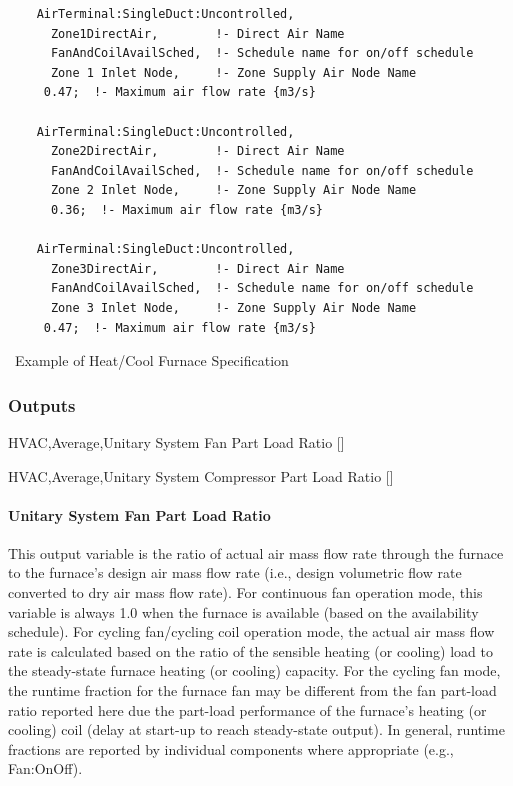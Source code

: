 \begin{lstlisting}
    AirTerminal:SingleDuct:Uncontrolled,
      Zone1DirectAir,        !- Direct Air Name
      FanAndCoilAvailSched,  !- Schedule name for on/off schedule
      Zone 1 Inlet Node,     !- Zone Supply Air Node Name
     0.47;  !- Maximum air flow rate {m3/s}

    AirTerminal:SingleDuct:Uncontrolled,
      Zone2DirectAir,        !- Direct Air Name
      FanAndCoilAvailSched,  !- Schedule name for on/off schedule
      Zone 2 Inlet Node,     !- Zone Supply Air Node Name
      0.36;  !- Maximum air flow rate {m3/s}

    AirTerminal:SingleDuct:Uncontrolled,
      Zone3DirectAir,        !- Direct Air Name
      FanAndCoilAvailSched,  !- Schedule name for on/off schedule
      Zone 3 Inlet Node,     !- Zone Supply Air Node Name
     0.47;  !- Maximum air flow rate {m3/s}
\end{lstlisting}

~Example of Heat/Cool Furnace Specification

\subsubsection{Outputs}\label{outputs-1-029}

HVAC,Average,Unitary System Fan Part Load Ratio {[]}

HVAC,Average,Unitary System Compressor Part Load Ratio {[]}

\paragraph{Unitary System Fan Part Load Ratio}\label{unitary-system-fan-part-load-ratio-1}

This output variable is the ratio of actual air mass flow rate through the furnace to the furnace's design air mass flow rate (i.e., design volumetric flow rate converted to dry air mass flow rate). For continuous fan operation mode, this variable is always 1.0 when the furnace is available (based on the availability schedule). For cycling fan/cycling coil operation mode, the actual air mass flow rate is calculated based on the ratio of the sensible heating (or cooling) load to the steady-state furnace heating (or cooling) capacity. For the cycling fan mode, the runtime fraction for the furnace fan may be different from the fan part-load ratio reported here due the part-load performance of the furnace's heating (or cooling) coil (delay at start-up to reach steady-state output). In general, runtime fractions are reported by individual components where appropriate (e.g., Fan:OnOff).

